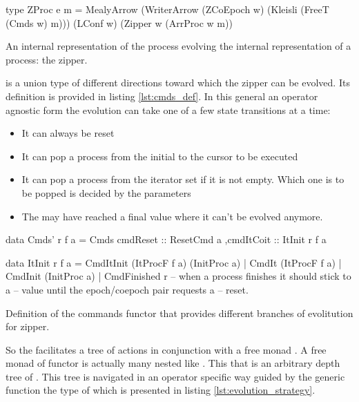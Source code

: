 \begin{code}
\begin{haskellcode}
type ZProc e m =
  MealyArrow
    (WriterArrow (ZCoEpoch w) (Kleisli (FreeT (Cmds w) m)))
    (LConf w)
    (Zipper w (ArrProc w m))
\end{haskellcode}
  \caption{\label{lst:zproc_def}An internal representation of the
    process evolving the internal representation of a process: the
    zipper.}
\end{code}


 is a union type of different directions toward which the
zipper can be evolved. Its definition is provided in listing
\ref{lst:cmds_def}. In this general an operator agnostic form the
evolution can take one of a few state transitions at a time:

\begin{itemize}
\item It can always be reset
\item It can pop a process from the initial to the cursor to be executed
\item It can pop a process from the iterator set if it is not
  empty. Which one is to be popped is decided by the parameters
\item The may have reached a final value where it can't be evolved
  anymore.
\end{itemize}

\begin{code}
\begin{haskellcode}
data Cmds' r f a =
  Cmds { cmdReset :: ResetCmd a
        ,cmdItCoit :: ItInit r f a
       }

data ItInit r f a
  = CmdItInit (ItProcF f a) (InitProc a)
  | CmdIt (ItProcF f a)
  | CmdInit (InitProc a)
  | CmdFinished r -- when a process finishes it should stick to a
                  -- value until the epoch/coepoch pair requests a
                  -- reset.
\end{haskellcode}
  \caption{\label{lst:cmds_def}Definition of the commands functor that
    provides different branches of evolitution for zipper.}
\end{code}

So the  facilitates a tree of actions in conjunction with a
free monad .  A free monad of functor  is actually many
 nested like . This that
 is an arbitrary depth tree of . This
tree is navigated in an operator specific way guided by the generic
function  the type of which is presented in
listing \ref{lst:evolution_strategy}.

